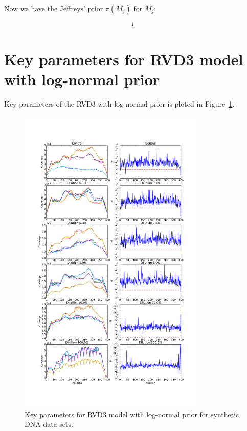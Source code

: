 \documentclass[11pt,reqno]{amsart}
\begin{document}
Now we have the Jeffreys' prior $\pi\left({M}_{j}\right)$ for $M_{j}$:

\begin{equation}
[-\left(\Psi_{1}(M_{j}) - \Psi_{1}(\mu_{j} M_{j})\mu_{j}^{2} - \Psi_{1}((1-\mu_{j})M_{j}){(1-\mu_{j})^{2}}\right)]^{\frac{1}{2}}
\end{equation}


\section{Key parameters for RVD3 model with log-normal prior}\label{sec:appendix_parameters}
Key parameters of the RVD3 with log-normal prior is ploted in Figure~\ref{fig:M_lognormal}.

\begin{figure}[htbp]
\begin{center}
\includegraphics[width=90mm]{figs/M_lognormal.pdf}
\caption{Key parameters for RVD3 model with log-normal prior for synthetic DNA data sets.}
\label{fig:M_lognormal}
\end{center}
\end{figure}



\end{document}
